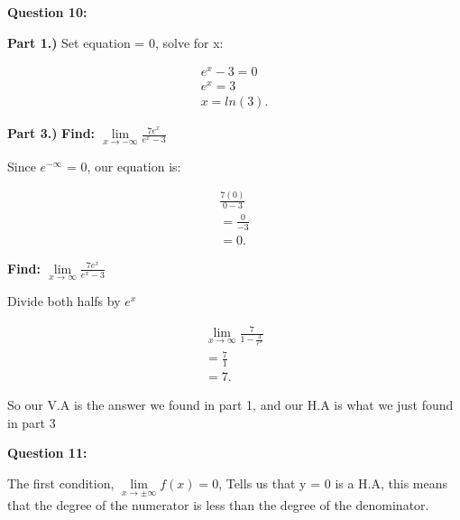 \documentclass{report}
\begin{document}
    \bigbreak \noindent \bigbreak \noindent 
    \begin{Large}
        \textbf{Question 10:}
    \end{Large}

    \bigbreak \noindent 
    \bigbreak \noindent 
    \textbf{Part 1.)}
    \bigbreak \noindent 
    Set equation = 0, solve for x:

    \begin{align*}
        e^x - 3 = 0 \\ 
        e^x = 3 \\ 
        x = ln(3)
    .\end{align*}

    \bigbreak \noindent 
    \textbf{Part 3.)}
    \bigbreak \noindent 
    \textbf{Find: $\lim\limits_{x \to - \infty}{ \frac{7e^x}{e^x-3}}$}

    \bigbreak \noindent 
    Since $e^{-\infty}$ = 0, our equation is: 

    \begin{align*}
        \frac{7 \left(0\right)}{0 - 3} \\ 
        = \frac{0}{-3} \\ 
        = 0
    .\end{align*}

    \bigbreak \noindent 
    \textbf{Find: $\lim\limits_{x \to \infty}{ \frac{7e^x}{e^x-3}}$}

    \bigbreak \noindent 
    Divide both halfs by $e^x$

    \begin{align*}
        \lim\limits_{x \to \infty}{ \frac{7}{1- \frac{3}{e^x}}} \\ 
        = \frac{7}{1} \\
        = 7
    .\end{align*}

    \bigbreak \noindent 
    So our V.A is the answer we found in part 1, and our H.A is what we just found in part 3 

    \bigbreak \noindent \bigbreak \noindent \bigbreak \noindent 
    \begin{Large}
        \textbf{Question 11:}
    \end{Large}
    \bigbreak \noindent 
    \bigbreak \noindent 
    The first condition, \textbf{\textit{ $\lim\limits_{x \to \pm \infty}{f(x)} = 0$}}, 
    Tells us that y = 0 is a H.A, this means that the degree of the numerator is less than 
    the degree of the denominator.
\end{document}
